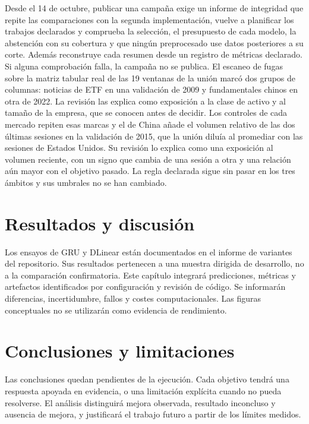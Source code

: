 \documentclass[11pt,a4paper]{report}
\begin{document}
Desde el 14 de octubre, publicar una campaña exige un informe de integridad
que repite las comparaciones con la segunda implementación, vuelve a planificar
los trabajos declarados y comprueba la selección, el presupuesto de cada
modelo, la abstención con su cobertura y que ningún preprocesado use datos
posteriores a su corte. Además reconstruye cada resumen desde un registro de
métricas declarado. Si alguna comprobación falla, la campaña no se publica. El
escaneo de fugas sobre la matriz tabular real de las 19 ventanas de la unión
marcó dos grupos de columnas: noticias de ETF en una validación de 2009 y
fundamentales chinos en otra de 2022. La revisión las explica como exposición
a la clase de activo y al tamaño de la empresa, que se conocen antes de
decidir. Los controles de cada mercado repiten esas marcas y el de China añade
el volumen relativo de las dos últimas sesiones en la validación de 2015, que
la unión diluía al promediar con las sesiones de Estados Unidos. Su revisión
lo explica como una exposición al volumen reciente, con un signo que cambia de
una sesión a otra y una relación aún mayor con el objetivo pasado. La regla
declarada sigue sin pasar en los tres ámbitos y sus umbrales no se han
cambiado.

\chapter{Resultados y discusión}
Los ensayos de GRU y DLinear están documentados en el informe de variantes del
repositorio. Sus resultados pertenecen a una muestra dirigida de desarrollo,
no a la comparación confirmatoria. Este capítulo integrará predicciones,
métricas y artefactos identificados por configuración y revisión de código.
Se informarán diferencias, incertidumbre, fallos y costes computacionales.
Las figuras conceptuales no se utilizarán como evidencia de rendimiento.

\chapter{Conclusiones y limitaciones}
Las conclusiones quedan pendientes de la ejecución. Cada objetivo tendrá una
respuesta apoyada en evidencia, o una limitación explícita cuando no pueda
resolverse. El análisis distinguirá mejora observada, resultado inconcluso y
ausencia de mejora, y justificará el trabajo futuro a partir de los límites medidos.

\printbibliography
\end{document}
